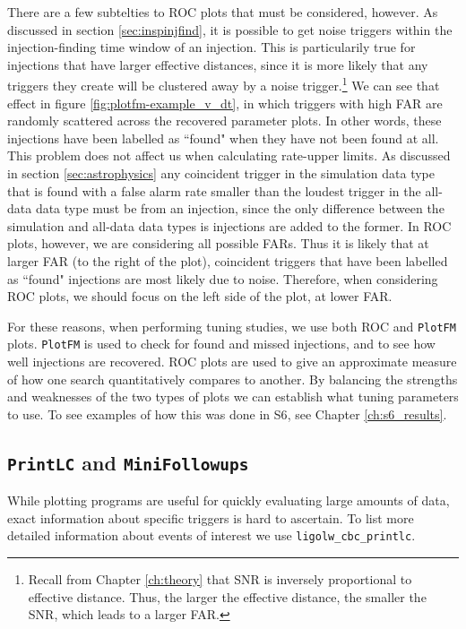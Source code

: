 There are a few subtelties to ROC plots that must be considered, however. As
discussed in section \ref{sec:inspinjfind}, it is possible to get noise
triggers within the injection-finding time window of an injection. This is
particularily true for injections that have larger effective distances, since
it is more likely that any triggers they create will be clustered away by a
noise trigger.\footnote{Recall from Chapter \ref{ch:theory} that \ac{SNR} is
inversely proportional to effective distance. Thus, the larger the effective
distance, the smaller the \ac{SNR}, which leads to a larger \ac{FAR}.} We can
see that effect in figure \ref{fig:plotfm-example_v_dt}, in which triggers with
high \ac{FAR} are randomly scattered across the recovered parameter plots. In
other words, these injections have been labelled as ``found" when they have not
been found at all. This problem does not affect us when calculating rate-upper
limits. As discussed in section \ref{sec:astrophysics} any coincident trigger
in the simulation data type that is found with a false alarm rate smaller than
the loudest trigger in the all-data data type must be from an injection, since
the only difference between the simulation and all-data data types is
injections are added to the former. In ROC plots, however, we are considering
all possible \acp{FAR}. Thus it is likely that at larger \ac{FAR} (to the right
of the plot), coincident triggers that have been labelled as ``found"
injections are most likely due to noise. Therefore, when considering ROC
plots, we should focus on the left side of the plot, at lower \ac{FAR}.

For these reasons, when performing tuning studies, we use both ROC and
\texttt{PlotFM} plots. \texttt{PlotFM} is used to check for found and missed
injections, and to see how well injections are recovered. ROC plots are used to
give an approximate measure of how one search quantitatively compares to
another. By balancing the strengths and weaknesses of the two types of plots we
can establish what tuning parameters to use. To see examples of how this was
done in \ac{S6}, see Chapter \ref{ch:s6_results}.

\subsection{\texttt{PrintLC} and \texttt{MiniFollowups}}
\label{sec:printlc-minifups}

While plotting programs are useful for quickly evaluating large amounts of
data, exact information about specific triggers is hard to ascertain. To list
more detailed information about events of interest we use
\verb|ligolw_cbc_printlc|.

